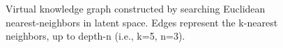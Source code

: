 \documentclass[sigconf,review,anonymous]{acmart}
\begin{document}
\begin{figure}[H]
    \caption{Virtual knowledge graph constructed by searching Euclidean nearest-neighbors in latent space. Edges represent the k-nearest neighbors, up to depth-n (i.e., k=5, n=3).}
    \label{fig:graphs}
  \end{figure}
\end{document}
